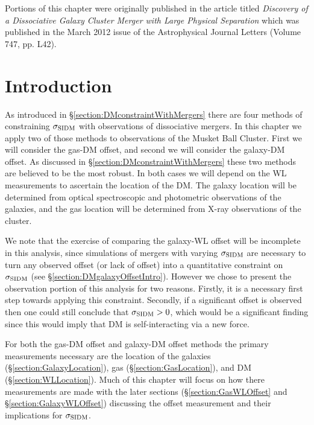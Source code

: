 \label{chapter:4}

\noindent Portions of this chapter were originally published in the article titled \emph{Discovery of a Dissociative Galaxy Cluster Merger with Large Physical Separation} which was published in the March 2012 issue of the Astrophysical Journal Letters (Volume 747, pp. L42). \\

\section{Introduction}

As introduced in \S\ref{section:DMconstraintWithMergers} there are four methods of constraining $\sigma_{\rm SIDM}$ with observations of dissociative mergers.
In this chapter we apply two of those methods to observations of the Musket Ball Cluster.
First we will consider the gas-DM offset, and second we will consider the galaxy-DM offset.
As discussed in \S\ref{section:DMconstraintWithMergers} these two methods are believed to be the most robust.
In both cases we will depend on the WL measurements to ascertain the location of the DM.
The galaxy location will be determined from optical spectroscopic and photometric observations of the galaxies, and the gas location will be determined from X-ray observations of the cluster.

We note that the exercise of comparing the galaxy-WL offset will be incomplete in this analysis, since simulations of mergers with varying $\sigma_{\rm SIDM}$ are necessary to turn any observed offset (or lack of offset) into a quantitative constraint on $\sigma_{\rm SIDM}$ (see \S\ref{section:DMgalaxyOffsetIntro}). 
However we chose to present the observation portion of this analysis for two reasons.
Firstly, it is a necessary first step towards applying this constraint.
Secondly, if a significant offset is observed then one could still conclude that $\sigma_{\rm SIDM}>0$, which would be a significant finding since this would imply that DM is self-interacting via a new force.

For both the gas-DM offset and galaxy-DM offset methods the primary measurements necessary are the location of the galaxies (\S\ref{section:GalaxyLocation}), gas (\S\ref{section:GasLocation}), and DM (\S\ref{section:WLLocation}).
Much of this chapter will focus on how there measurements are made with the later sections (\S\ref{section:GasWLOffset} and \S\ref{section:GalaxyWLOffset}) discussing the offset measurement and their implications for $\sigma_{\rm SIDM}$.

